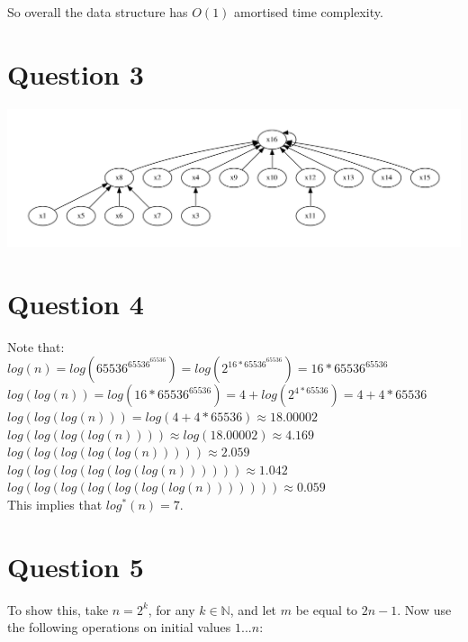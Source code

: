\documentclass[a4paper,11pt]{scrartcl}
\begin{document}
So overall the data structure has $O(1)$ amortised time complexity.

\section{Question 3}

\includegraphics[width=\textwidth]{diagram.pdf}

\section{Question 4}

Note that: \\
    $log(n) = log(65536^{65536^{65536}}) = log(2^{16 * 65536^{65536}}) = 16 * 65536 ^ {65536}$ \\
    $log(log(n)) = log(16 * 65536 ^ {65536}) = 4 + log(2 ^ {4 * 65536}) = 4 + 4 * 65536$ \\
    $log(log(log(n))) = log(4 + 4 * 65536) \approx 18.00002$ \\
    $log(log(log(log(n)))) \approx log(18.00002) \approx 4.169$ \\
    $log(log(log(log(log(n))))) \approx 2.059$ \\
    $log(log(log(log(log(log(n)))))) \approx 1.042$ \\
    $log(log(log(log(log(log(log(n))))))) \approx 0.059$ \\
This implies that $log^*(n) = 7$.

\section{Question 5}
To show this, take $n = 2^k$, for any $k \in \mathbb{N}$, and let $m$ be equal to $2n - 1$. Now use the following operations on initial values $1 ... n$: \\

\begin{algorithmic}
        \State {}
    \EndFor
    \State {}
\EndFor
\State {}

    \State {}
\EndFor
\end{algorithmic}
\end{document}
